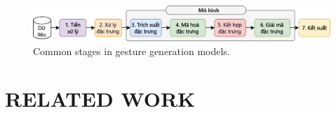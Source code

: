 \begin{figure}[htb]
	\centering
	\includegraphics[width=\linewidth]{images/CommonStage.png}
	\caption{Common stages in gesture generation models.}
	\label{fig:CommonStage}
\end{figure}

\section{RELATED WORK}
\label{sec:related_work}



